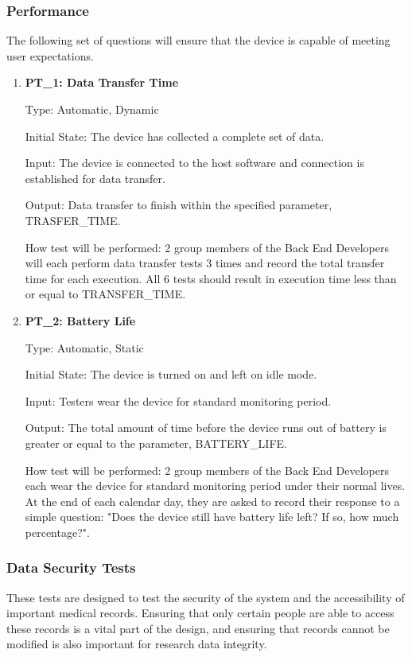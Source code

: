 \documentclass[12pt, titlepage]{article}
\begin{document}
\subsubsection{Performance}
The following set of questions will ensure that the device is capable of meeting user expectations.
\begin{enumerate}
\item\textbf{{PT\_1: Data Transfer Time\\}}\label{PT1}

Type: Automatic, Dynamic
					
Initial State: The device has collected a complete set of data.
					
Input: The device is connected to the host software and connection is established for data transfer.
					
Output: Data transfer to finish within the specified parameter, TRASFER\_TIME.
					
How test will be performed: 2 group members of the Back End Developers will each perform data transfer tests 3 times and record the total transfer time for each execution. All 6 tests should result in execution time less than or equal to TRANSFER\_TIME.

\item\textbf{{PT\_2: Battery Life\\}}\label{PT2}

Type: Automatic, Static
					
Initial State: The device is turned on and left on idle mode.
					
Input: Testers wear the device for standard monitoring period.
					
Output: The total amount of time before the device runs out of battery is greater or equal to the parameter, BATTERY\_LIFE.
					
How test will be performed: 2 group members of the Back End Developers each wear the device for standard monitoring period under their normal lives. At the end of each calendar day, they are asked to record their response to a simple question: "Does the device still have battery life left? If so, how much percentage?". 

\end{enumerate}
\pagebreak
\subsubsection{Data Security Tests}

These tests are designed to test the security of the system and the accessibility of important medical records. Ensuring that only certain people are able to access these records is a vital part of the design, and ensuring that records cannot be modified is also important for research data integrity. 
\end{document}
